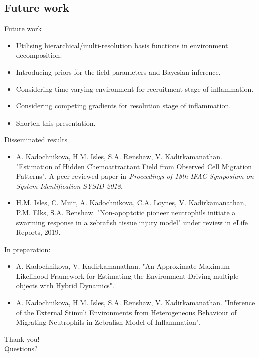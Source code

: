 \documentclass[mathserif,11pt]{beamer}
\begin{document}
\subsection{Future work}
\begin{frame}{Future work}
\begin{itemize}
	\item Utilising hierarchical/multi-resolution basis functions in environment decomposition.
	\item Introducing priors for the field parameters and Bayesian inference.
	\item Considering time-varying environment for recruitment stage of inflammation.
	\item Considering competing gradients for resolution stage of inflammation.
	\item Shorten this presentation.
\end{itemize}
\end{frame}
\begin{frame}{Disseminated results}
\footnotesize{
\begin{itemize}
\item A. Kadochnikova, H.M. Isles, S.A. Renshaw, V. Kadirkamanathan.
"Estimation of Hidden Chemoattractant Field from Observed Cell Migration Patterns". A peer-reviewed paper in \textit{Proceedings of 18th IFAC Symposium on System Identification SYSID 2018}.
\item H.M. Isles, C. Muir, A. Kadochnikova, C.A. Loynes, V. Kadirkamanathan, P.M. Elks, S.A. Renshaw. "Non-apoptotic pioneer neutrophils initiate a swarming response in a zebrafish tissue injury model" under review in eLife Reports, 2019.
\end{itemize} 
In preparation:
\begin{itemize}
	\item A. Kadochnikova, V. Kadirkamanathan.
	"An Approximate Maximum Likelihood Framework for Estimating the Environment Driving multiple objects with Hybrid Dynamics".
	\item A. Kadochnikova, H.M. Isles, S.A. Renshaw, V. Kadirkamanathan. "Inference of the
	External Stimuli Environments from Heterogeneous Behaviour of Migrating Neutrophils in Zebrafish Model of Inflammation".
\end{itemize}
}
\end{frame}
\begin{frame}
\centering
\Huge{Thank you!}\\
\huge{Questions?}
\end{frame}
%
\end{document}
